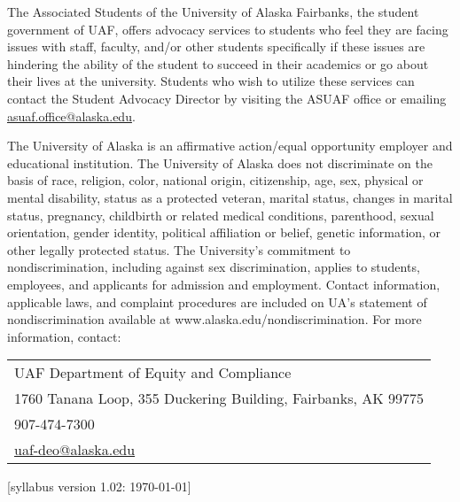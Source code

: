 \documentclass[12pt]{article}
\def\mailto#1{\href{mailto:#1}{#1}}
\begin{document}
The Associated Students of the University of Alaska Fairbanks, the student government of UAF, offers advocacy services to students who feel they are facing issues with staff, faculty, and/or other students specifically if these issues are hindering the ability of the student to succeed in their academics or go about their lives at the university. Students who wish to utilize these services can contact the Student Advocacy Director by visiting the ASUAF office or emailing \mailto{asuaf.office@alaska.edu}.

The University of Alaska is an affirmative action/equal opportunity employer and educational institution. The University of Alaska does not discriminate on the basis of race, religion, color, national origin, citizenship, age, sex, physical or mental disability, status as a protected veteran, marital status, changes in marital status, pregnancy, childbirth or related medical conditions, parenthood, sexual orientation, gender identity, political affiliation or belief, genetic information, or other legally protected status. The University's commitment to nondiscrimination, including against sex discrimination, applies to students, employees, and applicants for admission and employment. Contact information, applicable laws, and complaint procedures are included on UA's statement of nondiscrimination available at www.alaska.edu/nondiscrimination. For more information, contact:

\begin{tabular}{l}
UAF Department of Equity and Compliance\\
1760 Tanana Loop, 355 Duckering Building, Fairbanks, AK  99775\\
907-474-7300\\
\mailto{uaf-deo@alaska.edu}
\end{tabular}


\hfill  \scriptsize [syllabus version 1.02: \today] \normalsize
\end{document}
